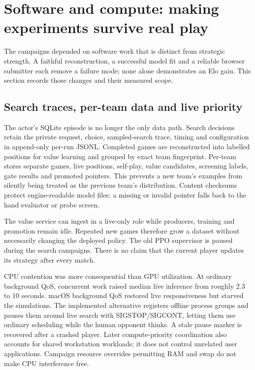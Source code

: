 \section{Software and compute: making experiments survive real play}
\label{sec:engineering}

The campaigns depended on software work that is distinct from strategic
strength. A faithful reconstruction, a successful model fit and a reliable
browser submitter each remove a failure mode; none alone demonstrates an
Elo gain. This section records those changes and their measured scope.

\subsection{Search traces, per-team data and live priority}
The actor's SQLite episode is no longer the only data path. Search decisions
retain the private request, choice, sampled-search trace, timing and
configuration in append-only per-run JSONL. Completed games are reconstructed
into labelled positions for value learning and grouped by exact team
fingerprint. Per-team stores separate games, live positions, self-play,
value candidates, screening labels, gate results and promoted pointers. This
prevents a new team's examples from silently being treated as the previous
team's distribution. Content checksums protect engine-readable model files;
a missing or invalid pointer falls back to the hand evaluator or probe screen.

The value service can ingest in a live-only role while producers, training
and promotion remain idle. Repeated new games therefore grow a dataset
without necessarily changing the deployed policy. The old PPO supervisor is
paused during the search campaigns. There is no claim that the current
player updates its strategy after every match.

CPU contention was more consequential than GPU utilization. At ordinary
background QoS, concurrent work raised median live inference from roughly
2.3 to 10 seconds. macOS background QoS restored live responsiveness but
starved the simulations. The implemented alternative registers offline
process groups and pauses them around live search with SIGSTOP/SIGCONT,
letting them use ordinary scheduling while the human opponent thinks. A
stale pause marker is recovered after a crashed player. Later compute-priority
coordination also accounts for shared workstation workloads; it does not
control unrelated user applications. Campaign resource overrides permitting
RAM and swap do not make CPU interference free.

